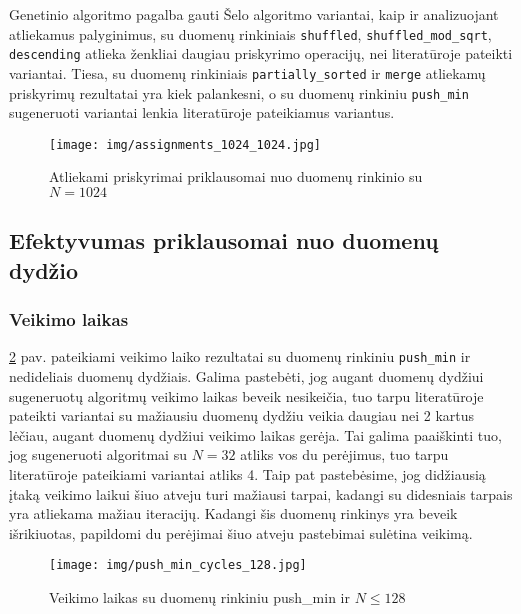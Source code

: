 \documentclass{VUMIFInfBakalaurinis}
\begin{document}
Genetinio algoritmo pagalba gauti Šelo algoritmo variantai, kaip ir analizuojant atliekamus palyginimus,
su duomenų rinkiniais \verb|shuffled|, \verb|shuffled_mod_sqrt|, \verb|descending| atlieka ženkliai daugiau priskyrimo operacijų, nei literatūroje pateikti variantai.
Tiesa, su duomenų rinkiniais \verb|partially_sorted| ir \verb|merge| atliekamų priskyrimų rezultatai yra kiek palankesni,
o su duomenų rinkiniu \verb|push_min|
sugeneruoti variantai lenkia literatūroje pateikiamus variantus.


\begin{figure}[H]
  \centering
  \texttt{[image: img/assignments\_1024\_1024.jpg]}
  \caption{Atliekami priskyrimai priklausomai nuo duomenų rinkinio su $N = 1024$}
  \label{img:assignments_1024_1024}
\end{figure}

\pagebreak

\subsection{Efektyvumas priklausomai nuo duomenų dydžio}

\subsubsection{Veikimo laikas}

\ref{img:push_min_cycles_128} pav. pateikiami veikimo laiko rezultatai su duomenų rinkiniu \verb|push_min| ir nedideliais duomenų dydžiais.
Galima pastebėti, jog augant duomenų dydžiui sugeneruotų algoritmų veikimo laikas beveik nesikeičia, tuo tarpu literatūroje pateikti variantai
su mažiausiu duomenų dydžiu veikia daugiau nei 2 kartus lėčiau, augant duomenų dydžiui veikimo laikas gerėja.
Tai galima paaiškinti tuo, jog sugeneruoti algoritmai su $N = 32$ atliks vos du perėjimus, tuo tarpu literatūroje pateikiami variantai atliks 4.
Taip pat pastebėsime, jog didžiausią įtaką veikimo laikui šiuo atveju turi mažiausi tarpai, kadangi su didesniais tarpais yra atliekama mažiau iteracijų.
Kadangi šis duomenų rinkinys yra beveik išrikiuotas, papildomi du perėjimai šiuo atveju pastebimai sulėtina veikimą.

\begin{figure}[H]
  \centering
  \texttt{[image: img/push\_min\_cycles\_128.jpg]}
  \caption{Veikimo laikas su duomenų rinkiniu push\_min ir $N \leq 128$}
  \label{img:push_min_cycles_128}
\end{figure}
\end{document}
